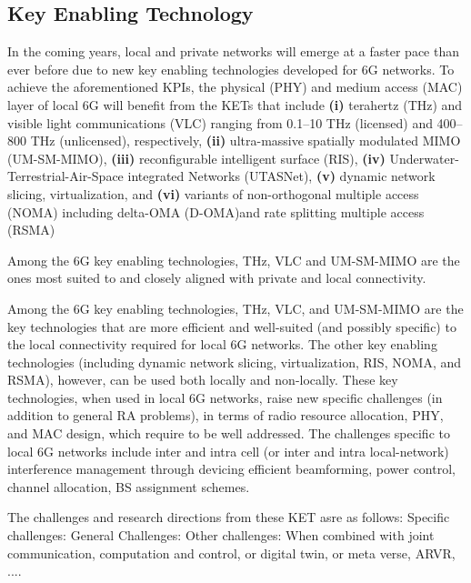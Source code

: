 \documentclass[journal,twocolumn]{IEEEtran}
\begin{document}
\subsection{Key Enabling Technology}
In the coming years, local and private networks will emerge at a faster pace than ever before due to new key enabling technologies developed for 6G networks. To achieve the aforementioned KPIs, the physical (PHY) and medium access (MAC) layer of local 6G will benefit from the  KETs that include
\textbf{(i)} terahertz (THz) and visible light communications (VLC) ranging from 0.1--10 THz (licensed) and  400--800  THz (unlicensed), respectively,
\textbf{(ii)} ultra-massive spatially modulated MIMO (UM-SM-MIMO),
\textbf{(iii)} reconfigurable intelligent surface (RIS), 
\textbf{(iv)} {U}nderwater-{T}errestrial-{A}ir-{S}pace integrated {Net}works (UTASNet), 
\textbf{(v)} dynamic network slicing, virtualization, and
\textbf{(vi)} variants of non-orthogonal multiple access (NOMA) including delta-OMA (D-OMA)and rate splitting multiple access (RSMA) \cite{6G-Tech}

Among the 6G key enabling technologies, THz, VLC and UM-SM-MIMO are the ones most suited to and closely aligned with private and local connectivity.

Among the 6G key enabling technologies, THz, VLC, and UM-SM-MIMO are the key technologies that are more efficient and well-suited (and possibly specific) to the local connectivity required for local 6G networks. The other key enabling technologies (including dynamic network slicing, virtualization, RIS, NOMA, and RSMA), however, can be used both locally and non-locally. These key technologies, when used in local 6G networks, raise new specific challenges (in addition to general RA problems), in terms of radio resource allocation, PHY, and MAC design, which require to be well addressed. The  challenges specific to local 6G networks include inter and intra cell (or inter and intra local-network) interference management through devicing efficient beamforming, power control, channel allocation, BS assignment schemes. 

The challenges and research directions from these KET asre as follows:
Specific challenges:
General Challenges:
Other challenges: When combined with joint communication, computation and control, or digital twin, or meta verse, ARVR, ....
\end{document}
